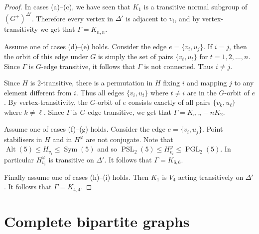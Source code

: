 \documentclass[11pt]{amsart}
\DeclareMathOperator{\Sym}{Sym}
\DeclareMathOperator{\Alt}{Alt}
\DeclareMathOperator{\Diag}{Diag}
\DeclareMathOperator{\PSL}{PSL}
\DeclareMathOperator{\PGL}{PGL}
\begin{document}
\begin{proof}
In cases (a)--(c), we have seen that $K_1$ is a transitive normal subgroup of $(G^+)^{\Delta'}$. Therefore every vertex in $\Delta'$ is adjacent to $v_i$, and by vertex-transitivity we get that $\Gamma=K_{n,n}.$

Assume one of cases (d)--(e) holds. Consider the edge $e=\{v_i,u_j\}$.  If $i=j$, then the orbit of this edge under $G$ is simply the set of pairs $\{v_t,u_t\}$ for $t=1,2,\ldots,n$. Since $\Gamma$ is $G$-edge transitive, it follows that $\Gamma$ is not connected. Thus  $i\neq j$.

Since $H$ is 2-transitive,   there is a permutation in $H$ fixing $i$ and mapping $j$ to any element different from $i$. Thus all edges $\{v_i,u_t\}$ where $t\neq i$ are in the $G$-orbit of $e$.  By vertex-transitivity, the $G$-orbit of $e$ consists exactly of  all pairs $\{v_k,u_\ell\}$ where $k\neq \ell$. Since $\Gamma$ is $G$-edge transitive, we get that $\Gamma=K_{n,n}-nK_2$.

Assume one of cases (f)--(g) holds.
Consider the edge $e=\{v_i,u_j\}$. 
    Point stabilisers in $H$ and in $H^\varphi$ are not conjugate. Note that \(\Alt(5)\leqslant H_{v_{i}}\leqslant \Sym(5)\) and so \(\PSL_{2}(5)\leqslant H_{v_{i}}^\varphi\leqslant \PGL_{2}(5)\). In particular $H_{v_i}^\varphi$ is transitive on $\Delta'$. It follows that $\Gamma=K_{6,6}$.

 Finally assume one of cases (h)--(i) holds.
Then $K_1$ is $V_4$ acting transitively on $\Delta'$. It follows that $\Gamma=K_{4,4}$.
\end{proof}



\section{Complete bipartite graphs}
\end{document}
